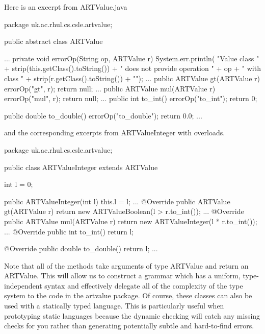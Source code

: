 Here is an excerpt from {\sf ARTValue.java}
\begin{codeblock}
package uk.ac.rhul.cs.csle.artvalue;

public abstract class ARTValue {
...
  private void errorOp(String op, ARTValue r) {
    System.err.println(
      "Value class " + strip(this.getClass().toString()) + 
      " does not provide operation " + op + " with class " + 
      strip(r.getClass().toString()) + "\n");
  }
...
  public ARTValue gt(ARTValue r) {
    errorOp("gt", r);
    return null;
  }
...
  public ARTValue mul(ARTValue r) {
    errorOp("mul", r);
    return null;
  }
...
  public int to_int() {
    errorOp("to_int");
    return 0;
  }

  public double to_double() {
    errorOp("to_double");
    return 0.0;
  }
...
}
\end{codeblock}
and the corresponding excerpts from {\sf ARTValueInteger} with overloads. 
\begin{codeblock}
package uk.ac.rhul.cs.csle.artvalue;

public class ARTValueInteger extends ARTValue {
  int l = 0;

  public ARTValueInteger(int l) {
    this.l = l;
  }
...
  @Override
  public ARTValue gt(ARTValue r) {
    return new ARTValueBoolean(l > r.to_int());
  }
...
  @Override
  public ARTValue mul(ARTValue r) {
    return new ARTValueInteger(l * r.to_int());
  }
...
  @Override
  public int to_int() {
    return l;
  }

  @Override
  public double to_double() {
    return l;
  }
...
}
\end{codeblock}
Note that all of the methods take arguments of type {\sf ARTValue} and return an {\sf ARTValue}. This will allow us to construct a grammar which has a uniform, type-independent syntax and effectively delegate all of the complexity of the type system to the code in the {\sf artvalue} package. Of course, these classes can also be used with a statically typed language. This is particularly useful when prototyping static languages because the dynamic checking will catch any missing checks for you rather than generating potentially subtle and hard-to-find errors.

